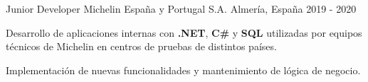   \cventry
    {Junior Developer}
    {Michelin España y Portugal S.A.}
  {Almería, España}
  {2019 - 2020}
  {
    \begin{cvitems}
      \item {Desarrollo de aplicaciones internas con \textbf{.NET}, \textbf{C\#} y \textbf{SQL} utilizadas por equipos técnicos de Michelin en centros de pruebas de distintos países.}
      \item {Implementación de nuevas funcionalidades y mantenimiento de lógica de negocio.}
    \end{cvitems}
  }
